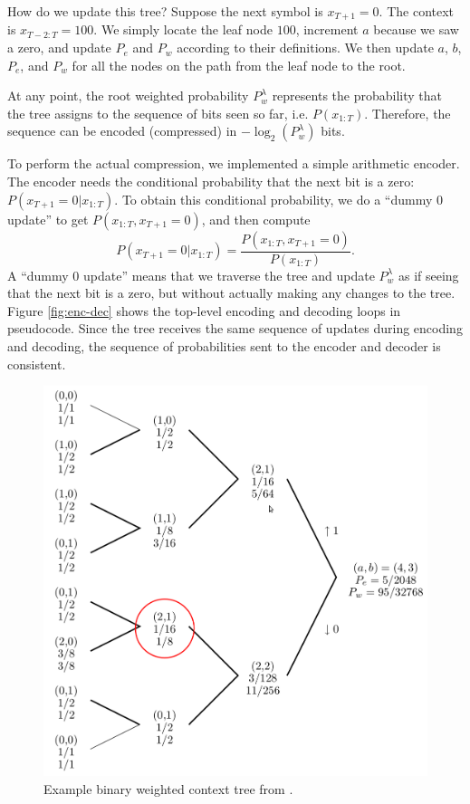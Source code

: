 \documentclass[11pt]{scrartcl}
\begin{document}
How do we update this tree? Suppose the next symbol is $x_{T+1} = 0$. The
context is $x_{T-2:T} = 100$. We simply locate the leaf node $100$, increment
$a$ because we saw a zero, and update $P_e$ and $P_w$ according to their
definitions. We then update $a$, $b$, $P_e$, and $P_w$ for all the nodes on the
path from the leaf node to the root.

At any point, the root weighted probability $P_w^\lambda$ represents the
probability that the tree assigns to the sequence of bits seen so far, i.e.
$P(x_{1:T})$. Therefore, the sequence can be encoded (compressed) in
$-\log_2(P_w^\lambda)$ bits.

To perform the actual compression, we implemented a simple arithmetic encoder.
The encoder needs the conditional probability that the next bit is a zero:
$P(x_{T+1} = 0 | x_{1:T})$. To obtain this conditional probability, we do a
``dummy 0 update'' to get $P(x_{1:T}, x_{T+1} = 0)$, and then compute
\[
P(x_{T+1} = 0 | x_{1:T}) = \frac{ P(x_{1:T}, x_{T+1} = 0) }{ P(x_{1:T}) }.
\]
A ``dummy 0 update'' means that we traverse the tree and update $P_w^\lambda$
as if seeing that the next bit is a zero, but without actually making any
changes to the tree. Figure \ref{fig:enc-dec} shows the top-level encoding and
decoding loops in pseudocode. Since the tree receives the same sequence of
updates during encoding and decoding, the sequence of probabilities sent to the
encoder and decoder is consistent.

\begin{figure}[h!]
    \centering
    \includegraphics[width=12cm]{eidma-fig-3-2-ed.png}
    \caption{Example binary weighted context tree from \textcite{eidma}.}
    \label{fig:bin-tree}
\end{figure}
\end{document}
